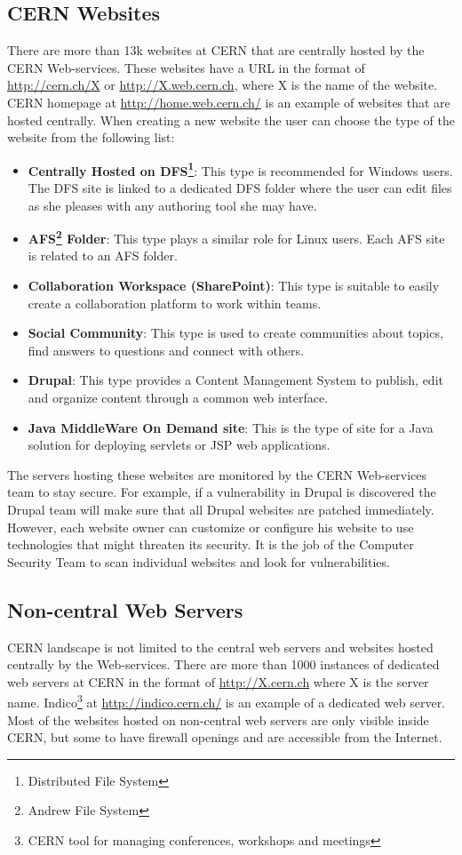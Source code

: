 \subsection{CERN Websites}
There are more than 13k websites at CERN that are centrally hosted by the CERN Web-services. These websites have a URL in the format of \url{http://cern.ch/X} or \url{http://X.web.cern.ch}, where X is the name of the website. CERN homepage at \url{http://home.web.cern.ch/} is an example of websites that are hosted centrally. When creating a new website the user can choose the type of the website from the following list:
\begin{itemize}
\item \textbf{Centrally Hosted on DFS\footnote{Distributed File System}}: This type is recommended for Windows users. The DFS site is linked to a dedicated DFS folder where the user can edit files as she pleases with any authoring tool she may have.
\item \textbf{AFS\footnote{Andrew File System} Folder}: This type plays a similar role for Linux users. Each AFS site is related to an AFS folder.
\item \textbf{Collaboration Workspace (SharePoint)}: This type is suitable to easily create a collaboration platform to work within teams.
\item \textbf{Social Community}: This type is used to create communities about topics, find answers to questions and connect with others.
\item \textbf{Drupal}: This type provides a Content Management System to publish, edit and organize content through a common web interface.
\item \textbf{Java MiddleWare On Demand site}: This is the type of site for a Java solution for deploying servlets or JSP web applications.
\end{itemize}
The servers hosting these websites are monitored by the CERN Web-services team to stay secure. For example, if a vulnerability in Drupal is discovered the Drupal team will make sure that all Drupal websites are patched immediately. However, each website owner can customize or configure his website to use technologies that might threaten its security. It is the job of the Computer Security Team to scan individual websites and look for vulnerabilities. 
\subsection{Non-central Web Servers}
CERN landscape is not limited to the central web servers and websites hosted centrally by the Web-services. There are more than 1000 instances of dedicated web servers at CERN in the format of \url{http://X.cern.ch} where X is the server name. Indico\footnote{CERN tool for managing conferences, workshops and meetings} at \url{http://indico.cern.ch/} is an example of a dedicated web server. Most of the websites hosted on non-central web servers are only visible inside CERN, but some to have firewall openings and are accessible from the Internet.

